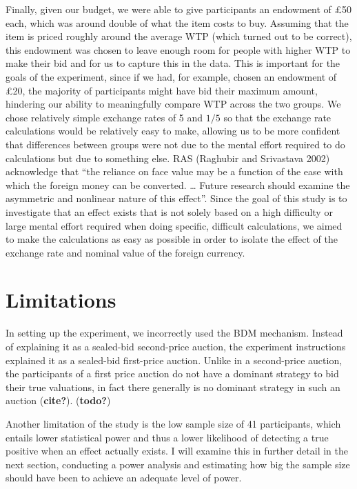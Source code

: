 \documentclass[
]{report}
\begin{document}
Finally, given our budget, we were able to give participants an
endowment of £50 each, which was around double of what the item costs to
buy. Assuming that the item is priced roughly around the average WTP
(which turned out to be correct), this endowment was chosen to leave
enough room for people with higher WTP to make their bid and for us to
capture this in the data. This is important for the goals of the
experiment, since if we had, for example, chosen an endowment of £20,
the majority of participants might have bid their maximum amount,
hindering our ability to meaningfully compare WTP across the two groups.
We chose relatively simple exchange rates of 5 and \(1/5\) so that the
exchange rate calculations would be relatively easy to make, allowing us
to be more confident that differences between groups were not due to the
mental effort required to do calculations but due to something else. RAS
(Raghubir and Srivastava 2002) acknowledge that ``the reliance on face
value may be a function of the ease with which the foreign money can be
converted. \ldots{} Future research should examine the asymmetric and
nonlinear nature of this effect''. Since the goal of this study is to
investigate that an effect exists that is not solely based on a high
difficulty or large mental effort required when doing specific,
difficult calculations, we aimed to make the calculations as easy as
possible in order to isolate the effect of the exchange rate and nominal
value of the foreign currency.

\section{Limitations}\label{limitations}

In setting up the experiment, we incorrectly used the BDM mechanism.
Instead of explaining it as a sealed-bid second-price auction, the
experiment instructions explained it as a sealed-bid first-price
auction. Unlike in a second-price auction, the participants of a first
price auction do not have a dominant strategy to bid their true
valuations, in fact there generally is no dominant strategy in such an
auction (\textbf{cite?}). (\textbf{todo?})

Another limitation of the study is the low sample size of 41
participants, which entails lower statistical power and thus a lower
likelihood of detecting a true positive when an effect actually exists.
I will examine this in further detail in the next section, conducting a
power analysis and estimating how big the sample size should have been
to achieve an adequate level of power.
\end{document}
